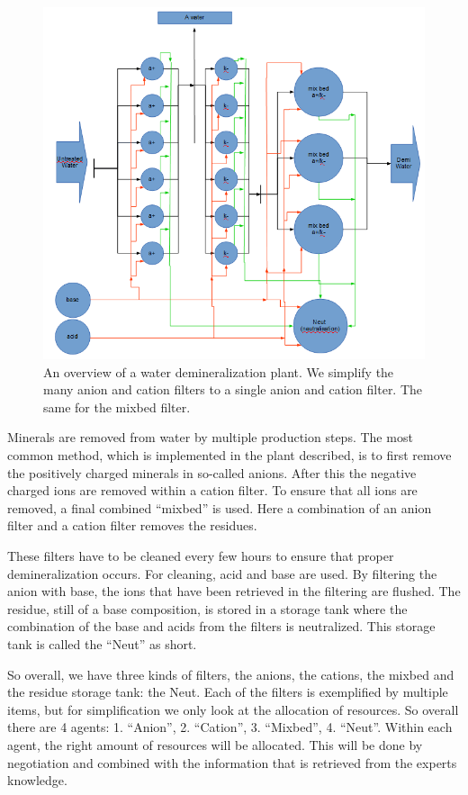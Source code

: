 \begin{figure}[h]
	\centering
	\includegraphics[width=1\linewidth]{img/demi-plant}
	\caption{An overview of a water demineralization plant. We simplify the many anion and cation filters to a single anion and cation filter. The same for the mixbed filter.}
	\label{fig:demi-plant}
\end{figure}
Minerals are removed from water by multiple production steps. The most common method, which is implemented in the plant described, is to first remove the positively charged minerals in so-called anions. After this the negative charged ions are removed within a cation filter. To ensure that all ions are removed, a final combined ``mixbed'' is used. Here a combination of an anion filter and a cation filter removes the residues.

These filters have to be cleaned every few hours to ensure that proper demineralization occurs. For cleaning, acid and base are used. By filtering the anion with base, the ions that have been retrieved in the filtering are flushed. The residue, still of a base composition, is stored in a storage tank where the combination of the base and acids from the filters is neutralized. This storage tank is called the ``Neut'' as short.

So overall, we have three kinds of filters, the anions, the cations, the mixbed and the residue storage tank: the Neut. Each of the filters is exemplified by multiple items, but for simplification we only look at the allocation of resources. So overall there are 4 agents: 1. ``Anion'', 2. ``Cation'', 3. ``Mixbed'', 4. ``Neut''. Within each agent, the right amount of resources will be allocated. This will be done by negotiation and combined with the information that is retrieved from the experts knowledge.


